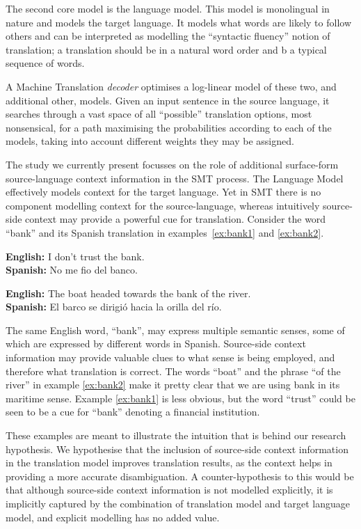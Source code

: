 \documentclass[smallextended]{svjour3}       %
\theoremstyle{break}
\begin{document}
The second core model is the language model. This model is monolingual
in nature and models the target language. It models what words are
likely to follow others and can be interpreted as modelling the
``syntactic fluency'' notion of translation; a translation should be
in a natural word order and b a typical sequence of words.

A Machine Translation \emph{decoder} optimises a log-linear model of
these two, and additional other, models. Given an input sentence in
the source language, it searches through a vast space of all
``possible'' translation options, most nonsensical, for a path
maximising the probabilities according to each of the models, taking
into account different weights they may be assigned.

The study we currently present focusses on the role of additional
surface-form source-language context
information in the SMT process. The Language Model effectively models context
for the target language. Yet in SMT there is no component modelling
context for the source-language, whereas intuitively source-side context may
provide a powerful cue for translation. Consider the word ``bank'' and its
Spanish translation in examples~\ref{ex:bank1} and \ref{ex:bank2}.

\begin{exe} %
\ex \textbf{English:} I don't trust the bank. \\
    \textbf{Spanish:} No me fio del banco.
\label{ex:bank1}

\ex \textbf{English:} The boat headed towards the bank of the river. \\
    \textbf{Spanish:} El barco se dirigió hacia la orilla del río.
\label{ex:bank2}
\end{exe}

The same English word, ``bank'', may express multiple semantic senses, some of
which are expressed by different words in Spanish. Source-side context
information may provide valuable clues to what sense is being employed, and
therefore what translation is correct.  The words ``boat'' and the phrase ``of
the river'' in example \ref{ex:bank2} make it pretty clear that we are using
bank in its maritime sense. Example \ref{ex:bank1} is less obvious, but the
word ``trust'' could be seen to be a cue for ``bank'' denoting a
financial institution.

These examples are meant to illustrate the intuition that is behind our
research hypothesis. We hypothesise that the inclusion of source-side context
information in the translation model improves translation results, as the
context helps in providing a more accurate disambiguation. A counter-hypothesis
to this would be that although source-side context information is not modelled
explicitly, it is implicitly captured by the combination of translation model
and target language model, and explicit modelling has no added value.
\end{document}
